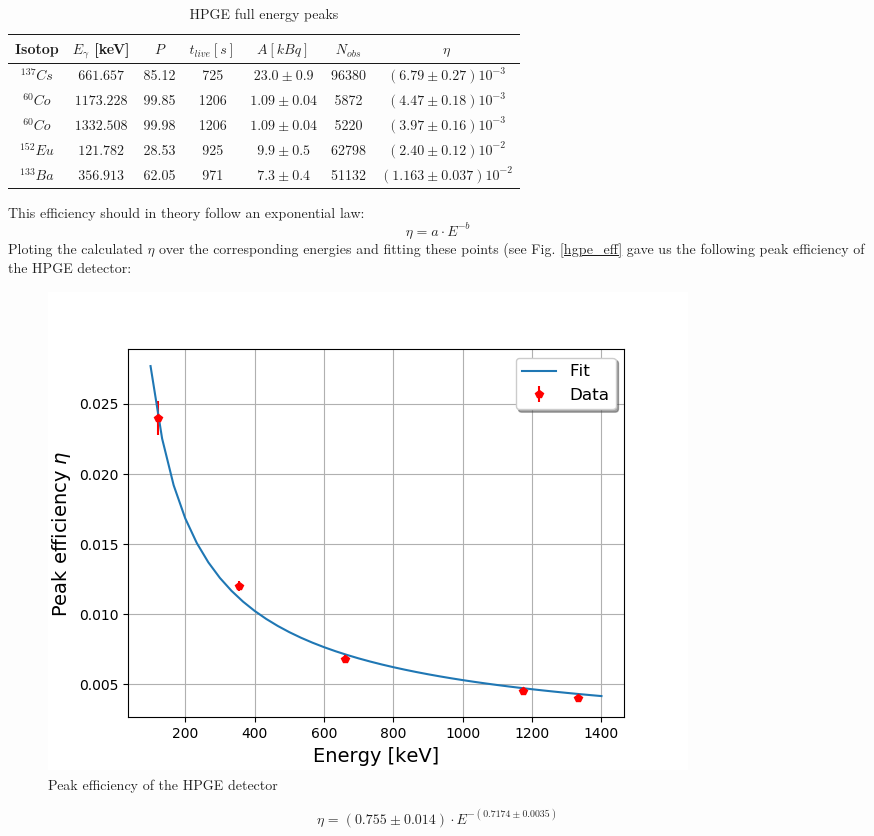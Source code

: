 \begin{table}[h]
\centering
\begin{tabular}{c |c | c |c | c | c | c}
\hline
Isotop & $E_{\gamma}$ [keV] & $P$ & $t_{live}[s]$  & $A [kBq]$ & $N_{obs}$ & $\eta$ \\
\hline
$^{137}Cs$ & $661.657$ & 85.12  & 725   & $23.0 \pm 0.9$ & 96380  & $ (6.79 \pm 0.27)10^{-3}$ \\
$^{60}Co$ & $1173.228$ & 99.85  & 1206 & $1.09 \pm 0.04$ & 5872  & $ (4.47 \pm 0.18)10^{-3}$ \\
$^{60}Co$ & $1332.508$  & 99.98 & 1206 & $1.09 \pm 0.04$ & 5220  & $ (3.97 \pm 0.16)10^{-3}$ \\
$^{152}Eu$ & $121.782$  & 28.53 & 925   & $9.9 \pm 0.5$ & 62798    & $ (2.40 \pm 0.12)10^{-2}$\\
$^{133}Ba$ & $356.913$  & 62.05 & 971   & $7.3 \pm 0.4$ & 51132    & $ (1.163 \pm 0.037)10^{-2}$\\
\hline
\end{tabular}
\caption{HPGE full energy peaks}
\label{hpge_eff_calc}
\end{table}

This efficiency should in theory follow an exponential law:
\begin{equation}
\eta = a \cdot E^{-b}
\end {equation}
Ploting the calculated $\eta$ over the corresponding energies and fitting these points (see Fig. \ref{hgpe_eff} gave us the following peak efficiency of the HPGE detector:
\begin{figure}[h]
  \includegraphics[width=\linewidth]{../Plots/hpge_eff.png}
  \caption{Peak efficiency of the HPGE detector}
  \label{hpge_eff}
\end{figure}
\begin{equation}
\eta = (0.755 \pm 0.014) \cdot E^{-(0.7174  \pm 0.0035)}
\label{peak_eff_eq}
\end {equation}

\clearpage
